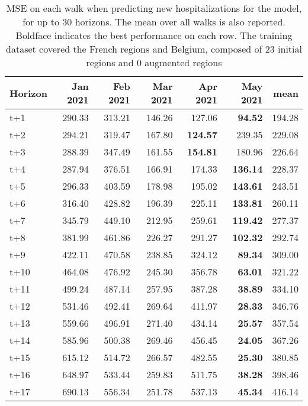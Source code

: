 \begin{table}[H]
\centering
\caption{MSE on each walk when predicting new hospitalizations for the model, for up to 30 horizons. The mean over all walks is also reported. Boldface indicates the best performance on each row. The training dataset covered the French regions and Belgium, composed of 23 initial regions and 0 augmented regions }
\label{tab:MSE_walk_encoder_decoder}
\begin{tabular}{lrrrrrr}
\toprule
Horizon &  Jan 2021 &  Feb 2021 &  Mar 2021 &  Apr 2021 &  May 2021 &   mean \\
\midrule
t+1  & 290.33  & 313.21  & 146.26  & 127.06  & \textbf{94.52}  & 194.28  \\
t+2  & 294.21  & 319.47  & 167.80  & \textbf{124.57}  & 239.35  & 229.08  \\
t+3  & 288.39  & 347.49  & 161.55  & \textbf{154.81}  & 180.96  & 226.64  \\
t+4  & 287.94  & 376.51  & 166.91  & 174.33  & \textbf{136.14}  & 228.37  \\
t+5  & 296.33  & 403.59  & 178.98  & 195.02  & \textbf{143.61}  & 243.51  \\
t+6  & 316.40  & 428.82  & 196.39  & 225.11  & \textbf{133.81}  & 260.11  \\
t+7  & 345.79  & 449.10  & 212.95  & 259.61  & \textbf{119.42}  & 277.37  \\
t+8  & 381.99  & 461.86  & 226.27  & 291.27  & \textbf{102.32}  & 292.74  \\
t+9  & 422.11  & 470.58  & 238.85  & 324.12  & \textbf{89.34}  & 309.00  \\
t+10  & 464.08  & 476.92  & 245.30  & 356.78  & \textbf{63.01}  & 321.22  \\
t+11  & 499.24  & 487.14  & 257.95  & 387.28  & \textbf{38.89}  & 334.10  \\
t+12  & 531.46  & 492.41  & 269.64  & 411.97  & \textbf{28.33}  & 346.76  \\
t+13  & 559.66  & 496.91  & 271.40  & 434.14  & \textbf{25.57}  & 357.54  \\
t+14  & 585.96  & 500.38  & 269.46  & 456.45  & \textbf{24.05}  & 367.26  \\
t+15  & 615.12  & 514.72  & 266.57  & 482.55  & \textbf{25.30}  & 380.85  \\
t+16  & 648.97  & 533.44  & 259.83  & 511.75  & \textbf{38.28}  & 398.46  \\
t+17  & 690.13  & 556.34  & 251.78  & 537.13  & \textbf{45.34}  & 416.14  \\

\end{tabular}
\end{table}
